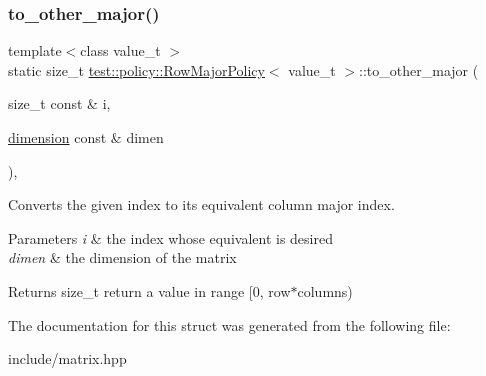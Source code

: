 \subsubsection{\texorpdfstring{to\_other\_major()}{to\_other\_major()}}
{\footnotesize\ttfamily template$<$class value\+\_\+t $>$ \\
static size\+\_\+t \mbox{\hyperlink{structtest_1_1policy_1_1RowMajorPolicy}{test\+::policy\+::\+Row\+Major\+Policy}}$<$ value\+\_\+t $>$\+::to\+\_\+other\+\_\+major (\begin{DoxyParamCaption}\item[{size\+\_\+t const \&}]{i,  }\item[{\mbox{\hyperlink{structtest_1_1dimension}{dimension}} const \&}]{dimen }\end{DoxyParamCaption})\hspace{0.3cm}{\ttfamily [inline]}, {\ttfamily [static]}}



Converts the given index to its equivalent column major index. 


\begin{DoxyParams}{Parameters}
{\em i} & the index whose equivalent is desired \\
\hline
{\em dimen} & the dimension of the matrix \\
\hline
\end{DoxyParams}
\begin{DoxyReturn}{Returns}
size\+\_\+t return a value in range \mbox{[}0, row$\ast$columns) 
\end{DoxyReturn}


The documentation for this struct was generated from the following file\+:\begin{DoxyCompactItemize}
\item 
include/matrix.\+hpp\end{DoxyCompactItemize}
